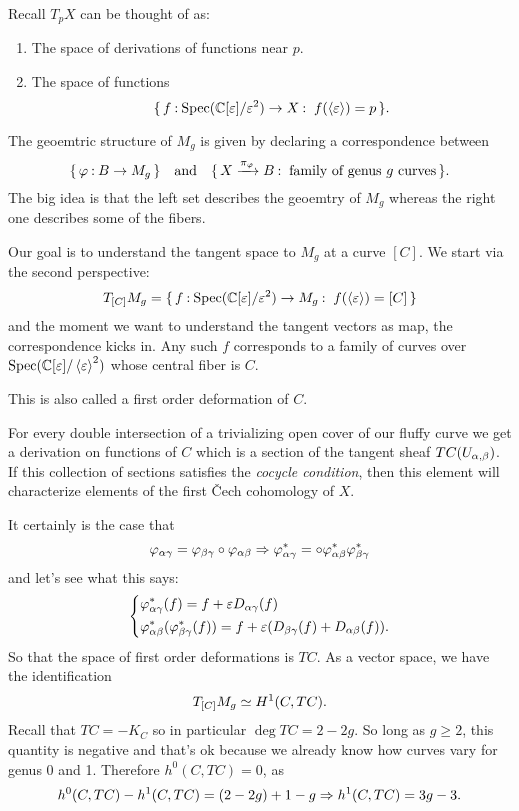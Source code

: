 \documentclass[12pt]{memoir}
\begin{document}
Recall $T_pX$ can be thought of as:
\begin{enumerate}
    \item The space of derivations of functions near $p$.
    \item The space of functions 
    $$\set{f\:\Spec(\bC[\eps]/\eps^2)\to X\:\ f(\genr{\eps})=p}.$$
\end{enumerate}
The geoemtric structure of $M_g$ is given by declaring a correspondence between 
$$\{\,\varphi\mathbin{:} B\to M_g\,\}\quad\text{and}\quad\{\,X\xrightarrow{\pi_\varphi}B\mathbin{:}\ \text{family of genus }g\text{ curves}\,\}.$$
The big idea is that the left set describes the geoemtry of $M_g$ whereas the right one describes some of the fibers.\par
Our goal is to understand the tangent space to $M_g$ at a curve $[C]$. We start via the second perspective:
$$T_{[C]}M_g=\{\,f\mathbin{:}\operatorname{Spec}(\mathbb{C}[\varepsilon]/\varepsilon^2)\to M_g\mathbin{:}\ f(\left\langle \varepsilon\right\rangle)=[C]\,\}$$
and the moment we want to understand the tangent vectors as map, the correspondence kicks in. Any such $f$ corresponds to a family of curves over $\operatorname{Spec}(\mathbb{C}[\varepsilon]/\left\langle \varepsilon\right\rangle^2)$ whose central fiber is $C$.
\begin{Rmk}
    This is also called a first order deformation of $C$. 
\end{Rmk}
For every double intersection of a trivializing open cover of our fluffy curve we get a derivation on functions of $C$ which is a section of the tangent sheaf $TC(U_{\alpha,\beta})$. If this collection of sections satisfies the \emph{cocycle condition}, then this element will characterize elements of the first \v{C}ech cohomology of $X$.\par
It certainly is the case that
$$\varphi_{\alpha\gamma}=\varphi_{\beta\gamma}\circ\varphi_{\alpha\beta}\Rightarrow\varphi^\ast_{\alpha\gamma}=\circ\varphi_{\alpha\beta}^\ast\varphi_{\beta\gamma}^\ast$$
and let's see what this says:
$$
\left\lbrace
\begin{aligned}
    &\varphi_{\alpha\gamma}^\ast(f)=f+\varepsilon D_{\alpha\gamma}(f)\\
    &\varphi_{\alpha\beta}^\ast(\varphi^\ast_{\beta\gamma}(f))=f+\varepsilon(D_{\beta\gamma}(f)+D_{\alpha\beta}(f)).
\end{aligned}
\right.
$$ 
So that the space of first order deformations is $TC$. As a vector space, we have the identification
$$T_{\left\lbrack C\right\rbrack}M_g\simeq H^1(C,TC).$$
Recall that $TC=-K_C$ so in particular $\deg TC=2-2g$. So long as $g\geq 2$, this quantity is negative and that's ok because we already know how curves vary for genus 0 and 1. Therefore $h^0(C,TC)=0$, as
$$h^0(C,TC)-h^1(C,TC)=(2-2g)+1-g\Rightarrow h^1(C,TC)=3g-3.$$

\ifx\nextra\undefined
\printindex
\else\fi
\nocite{*}


\end{document}
